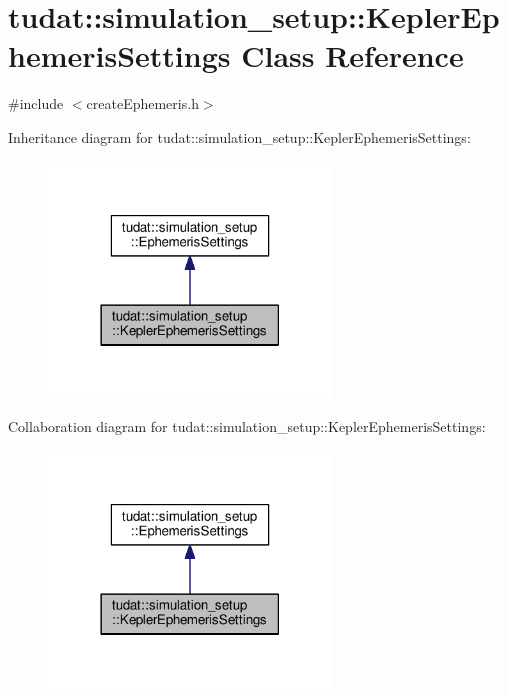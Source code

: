 \hypertarget{classtudat_1_1simulation__setup_1_1KeplerEphemerisSettings}{}\section{tudat\+:\+:simulation\+\_\+setup\+:\+:Kepler\+Ephemeris\+Settings Class Reference}
\label{classtudat_1_1simulation__setup_1_1KeplerEphemerisSettings}


{\ttfamily \#include $<$create\+Ephemeris.\+h$>$}



Inheritance diagram for tudat\+:\+:simulation\+\_\+setup\+:\+:Kepler\+Ephemeris\+Settings\+:
\nopagebreak
\begin{figure}[H]
\begin{center}
\leavevmode
\includegraphics[width=213pt]{classtudat_1_1simulation__setup_1_1KeplerEphemerisSettings__inherit__graph}
\end{center}
\end{figure}


Collaboration diagram for tudat\+:\+:simulation\+\_\+setup\+:\+:Kepler\+Ephemeris\+Settings\+:
\nopagebreak
\begin{figure}[H]
\begin{center}
\leavevmode
\includegraphics[width=213pt]{classtudat_1_1simulation__setup_1_1KeplerEphemerisSettings__coll__graph}
\end{center}
\end{figure}
